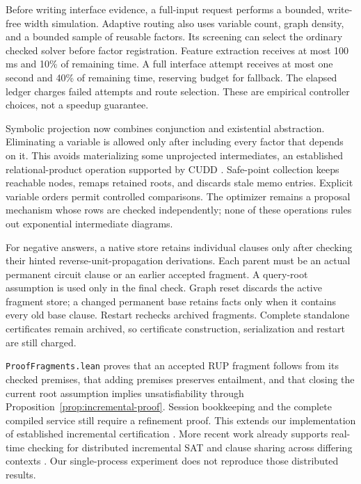 \documentclass[11pt,a4paper]{article}
\numberwithin{equation}{section}
\theoremstyle{plain}
\theoremstyle{definition}
\theoremstyle{remark}
\begin{document}
Before writing interface evidence, a full-input request performs a bounded, write-free width simulation. Adaptive routing also uses variable count, graph density, and a bounded sample of reusable factors. Its screening can select the ordinary checked solver before factor registration. Feature extraction receives at most 100\,ms and 10\% of remaining time. A full interface attempt receives at most one second and 40\% of remaining time, reserving budget for fallback. The elapsed ledger charges failed attempts and route selection. These are empirical controller choices, not a speedup guarantee.

Symbolic projection now combines conjunction and existential abstraction. Eliminating a variable is allowed only after including every factor that depends on it. This avoids materializing some unprojected intermediates, an established relational-product operation supported by CUDD \citep{somenziCudd}. Safe-point collection keeps reachable nodes, remaps retained roots, and discards stale memo entries. Explicit variable orders permit controlled comparisons. The optimizer remains a proposal mechanism whose rows are checked independently; none of these operations rules out exponential intermediate diagrams.

For negative answers, a native store retains individual clauses only after checking their hinted reverse-unit-propagation derivations. Each parent must be an actual permanent circuit clause or an earlier accepted fragment. A query-root assumption is used only in the final check. Graph reset discards the active fragment store; a changed permanent base retains facts only when it contains every old base clause. Restart rechecks archived fragments. Complete standalone certificates remain archived, so certificate construction, serialization and restart are still charged.

\texttt{ProofFragments.lean} proves that an accepted RUP fragment follows from its checked premises, that adding premises preserves entailment, and that closing the current root assumption implies unsatisfiability through Proposition~\ref{prop:incremental-proof}. Session bookkeeping and the complete compiled service still require a refinement proof. This extends our implementation of established incremental certification \citep{fazekas2024incremental}. More recent work already supports real-time checking for distributed incremental SAT and clause sharing across differing contexts \citep{schreiber2026realtime}. Our single-process experiment does not reproduce those distributed results.
\end{document}
